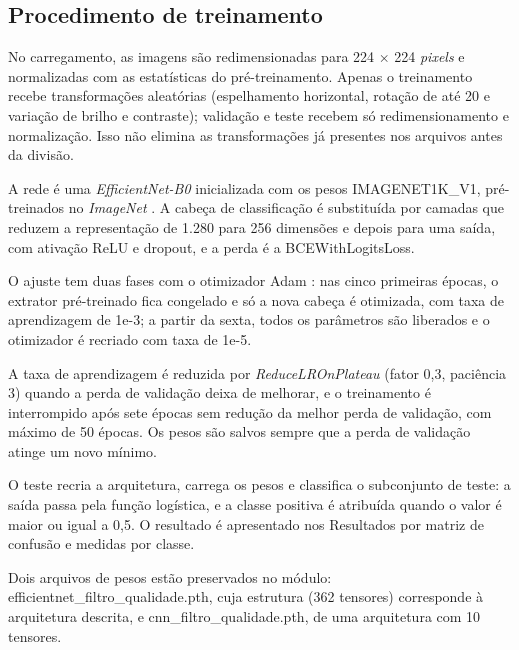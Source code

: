 \subsection{Procedimento de treinamento}
\label{sec:procedimento-treinamento-classificador}

No carregamento, as imagens s\~ao redimensionadas para 224 $\times$ 224 \textit{pixels} e normalizadas com as estat\'isticas do pr\'e-treinamento. Apenas o treinamento recebe transforma\c{c}\~oes aleat\'orias (espelhamento horizontal, rota\c{c}\~ao de at\'e 20\textdegree{} e varia\c{c}\~ao de brilho e contraste); valida\c{c}\~ao e teste recebem s\'o redimensionamento e normaliza\c{c}\~ao. Isso n\~ao elimina as transforma\c{c}\~oes j\'a presentes nos arquivos antes da divis\~ao.

A rede \'e uma \textit{EfficientNet-B0} \citep{tan2019} inicializada com os pesos IMAGENET1K\_V1, pr\'e-treinados no \textit{ImageNet} \citep{deng2009}. A cabe\c{c}a de classifica\c{c}\~ao \'e substitu\'ida por camadas que reduzem a representa\c{c}\~ao de 1.280 para 256 dimens\~oes e depois para uma sa\'ida, com ativa\c{c}\~ao ReLU e dropout, e a perda \'e a BCEWithLogitsLoss.

O ajuste tem duas fases com o otimizador Adam \citep{kingma2015}: nas cinco primeiras \'epocas, o extrator pr\'e-treinado fica congelado e s\'o a nova cabe\c{c}a \'e otimizada, com taxa de aprendizagem de 1e-3; a partir da sexta, todos os par\^ametros s\~ao liberados e o otimizador \'e recriado com taxa de 1e-5.

A taxa de aprendizagem \'e reduzida por \textit{ReduceLROnPlateau} (fator 0,3, paci\^encia 3) quando a perda de valida\c{c}\~ao deixa de melhorar, e o treinamento \'e interrompido ap\'os sete \'epocas sem redu\c{c}\~ao da melhor perda de valida\c{c}\~ao, com m\'aximo de 50 \'epocas. Os pesos s\~ao salvos sempre que a perda de valida\c{c}\~ao atinge um novo m\'inimo.

O teste recria a arquitetura, carrega os pesos e classifica o subconjunto de teste: a sa\'ida passa pela fun\c{c}\~ao log\'istica, e a classe positiva \'e atribu\'ida quando o valor \'e maior ou igual a 0,5. O resultado \'e apresentado nos Resultados por matriz de confus\~ao e medidas por classe.

Dois arquivos de pesos est\~ao preservados no m\'odulo: efficientnet\_filtro\_qualidade.pth, cuja estrutura (362 tensores) corresponde \`a arquitetura descrita, e cnn\_filtro\_qualidade.pth, de uma arquitetura com 10 tensores.

